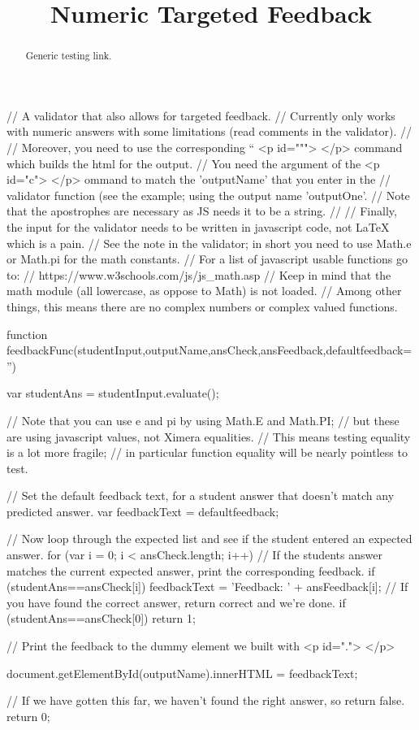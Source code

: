 \documentclass{ximera}
\title{Numeric Targeted Feedback}
\def\HCode{}
\begin{document}
\setcounter{feedbackOutput}{0}

\newcommand{\feedbackOutput}[1]{
    \HCode{<p id="#1">}
    \HCode{</p>}
    }
\begin{abstract}
Generic testing link.
\end{abstract}
\maketitle

\begin{javascript}
//  A validator that also allows for targeted feedback. 
//  Currently only works with numeric answers with some limitations (read comments in the validator). 
//  
//  Moreover, you need to use the corresponding ``\feedbackOutput" command which builds the html for the output.
//  You need the argument of the \feedbackOutput command to match the 'outputName' that you enter in the
//      validator function (see the example; using the output name 'outputOne'. 
//      Note that the apostrophes are necessary as JS needs it to be a string.
//
//  Finally, the input for the validator needs to be written in javascript code, not LaTeX which is a pain.
//      See the note in the validator; in short you need to use Math.e or Math.pi for the math constants.
//      For a list of javascript usable functions go to:
//          https://www.w3schools.com/js/js_math.asp
//      Keep in mind that the math module (all lowercase, as oppose to Math) is not loaded.
//          Among other things, this means there are no complex numbers or complex valued functions.


function feedbackFunc(studentInput,outputName,ansCheck,ansFeedback,defaultfeedback='') {
    var studentAns = studentInput.evaluate();
    
    // Note that you can use e and pi by using Math.E and Math.PI; 
    //      but these are using javascript values, not Ximera equalities.
    // This means testing equality is a lot more fragile; 
    //      in particular function equality will be nearly pointless to test.
    
    // Set the default feedback text, for a student answer that doesn't match any predicted answer.
    var feedbackText = defaultfeedback;
        
    // Now loop through the expected list and see if the student entered an expected answer.
    for (var i = 0; i < ansCheck.length; i++) {
        // If the students answer matches the current expected answer, print the corresponding feedback.
        if (studentAns==ansCheck[i]) {
            feedbackText = 'Feedback: ' + ansFeedback[i];
        }
        // If you have found the correct answer, return correct and we're done.
        if (studentAns==ansCheck[0]) {
            return 1;
            } 
    }
    
    // Print the feedback to the dummy element we built with \feedbackOutput.
    document.getElementById(outputName).innerHTML = feedbackText;
    
    // If we have gotten this far, we haven't found the right answer, so return false.
    return 0;
}
\end{javascript}
\end{document}
